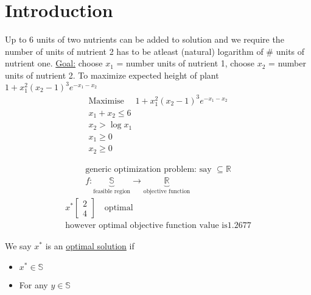 \section*{Introduction}
\begin{example-N}
	Up to 6 units of two nutrients can be added to solution and we require the number of units of nutrient 2 has to be atleast (natural) logarithm of \# units of nutrient one. \underline{Goal:} choose $x_1$ = number units of nutrient 1, choose $x_2$ = number units of nutrient 2. To maximize expected height of plant $1 + x_1^2(x_2-1)^3 e^{-x_1-x_2}$
\begin{gather*}
	\text{Maximise } \quad 1 + x_1^2(x_2-1)^3 e^{-x_1-x_2}\\ 
	x_1 + x_2 \leq 6\\
	x_2 > \log x_1 \\
	x_1 \geq 0\\
	x_2 \geq 0
\end{gather*}
\begin{center}
\end{center}
\begin{gather*}
	\text{generic optimization problem: say } \subseteq \mathbb{R}\\
		f: \underbrace{\mathbb{S}}_{\text{feasible region}} \rightarrow \underbrace{\mathbb{R}}_{\text{objective function}}
\end{gather*}
\begin{gather*}
	x^* \begin{bmatrix}
		2\\4
	\end{bmatrix} \quad \text{optimal}\\
	\text{however optimal objective function value is} 1.2677
\end{gather*}
\end{example-N}
\begin{definition-N}
	We say $x^*$ is an \underline{optimal solution} if
	\begin{itemize}
		\item $x^* \in \mathbb{S}$
		\item For any $y \in \mathbb{S}$
	\end{itemize}
\end{definition-N}
